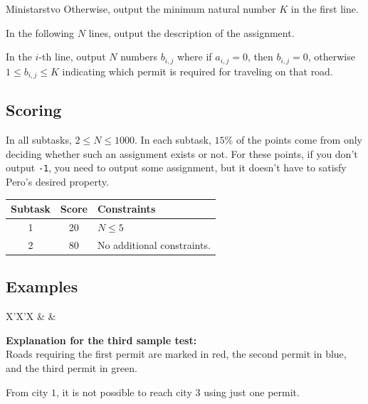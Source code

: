 \begin{statement}[
  problempoints=100,
  timelimit=1 second,
  memorylimit=1024 MiB,
]{Ministarstvo}
Otherwise, output the minimum natural number $K$ in the first line.

In the following $N$ lines, output the description of the assignment.

In the $i$-th line, output $N$ numbers $b_{i, j}$ where if $a_{i, j} = 0$, then $b_{i, j} = 0$, otherwise $1 \leq b_{i, j} \leq K$ indicating which permit is required for traveling on that road. 

\subsection*{Scoring}

In all subtasks, $2 \leq N \leq 1000$. In each subtask, $15\%$ of the points come from only deciding whether such an assignment exists or not. For these points, if you don't output \texttt{-1}, you need to output some assignment, but it doesn't have to satisfy Pero's desired property. 

{\renewcommand{\arraystretch}{1.4}
  \setlength{\tabcolsep}{6pt}
  \begin{tabular}{ccl}
   Subtask & Score & Constraints \\ \midrule
    1 & 20 & $N \leq 5$  \\
    2 & 80 & No additional constraints. \\
\end{tabular}}

\subsection*{Examples}
\begin{tabularx}{\textwidth}{X'X'X}
 &
 &
\end{tabularx}

\textbf{Explanation for the third sample test:}\\

Roads requiring the first permit are marked in red, the second permit in blue, and the third permit in green.

From city $1$, it is not possible to reach city $3$ using just one permit.


\end{statement}

